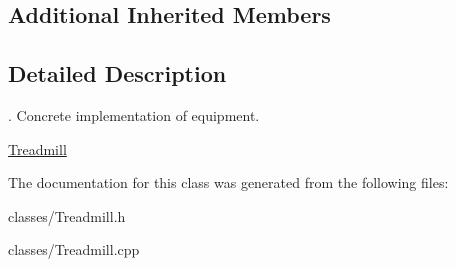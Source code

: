 \subsection*{Additional Inherited Members}


\subsection{Detailed Description}
. Concrete implementation of equipment.

\hyperlink{class_treadmill}{Treadmill} 

The documentation for this class was generated from the following files\+:\begin{DoxyCompactItemize}
\item 
classes/Treadmill.\+h\item 
classes/Treadmill.\+cpp\end{DoxyCompactItemize}
